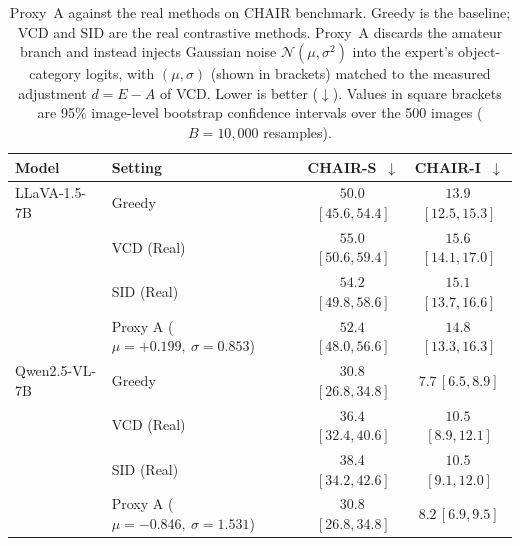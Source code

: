 \begin{table}[h]
  \centering
  \small
  \setlength{\tabcolsep}{6pt}
  \vspace{\baselineskip}
  \caption{Proxy~A against the real methods on CHAIR benchmark. Greedy is the
  baseline; VCD and SID are the real contrastive methods. Proxy~A discards the
  amateur branch and instead injects Gaussian noise $\mathcal{N}(\mu,\sigma^{2})$
  into the expert's object-category logits, with $(\mu,\sigma)$ (shown in
  brackets) matched to the measured adjustment $d = E - A$ of VCD. Lower is better ($\downarrow$).
  Values in square brackets are 95\% image-level bootstrap confidence intervals over the 500 images ($B=10{,}000$ resamples).}
  \vspace{\baselineskip}
  \label{tab:proxyA-noise}
  \begin{tabular}{ll cc}
    \toprule
    Model & Setting & CHAIR-S~$\downarrow$ & CHAIR-I~$\downarrow$ \\
    \midrule
    LLaVA-1.5-7B  & Greedy    & $50.0$\,{\scriptsize$[45.6,54.4]$} & $13.9$\,{\scriptsize$[12.5,15.3]$} \\
                  & VCD (Real) & $55.0$\,{\scriptsize$[50.6,59.4]$} & $15.6$\,{\scriptsize$[14.1,17.0]$} \\
                  & SID (Real) & $54.2$\,{\scriptsize$[49.8,58.6]$} & $15.1$\,{\scriptsize$[13.7,16.6]$} \\
                  & Proxy A ($\mu{=}{+}0.199,\ \sigma{=}0.853$) & $52.4$\,{\scriptsize$[48.0,56.6]$} & $14.8$\,{\scriptsize$[13.3,16.3]$} \\
    \midrule
    Qwen2.5-VL-7B & Greedy    & $30.8$\,{\scriptsize$[26.8,34.8]$} & $7.7$\,{\scriptsize$[6.5,8.9]$} \\
                  & VCD (Real) & $36.4$\,{\scriptsize$[32.4,40.6]$} & $10.5$\,{\scriptsize$[8.9,12.1]$} \\
                  & SID (Real) & $38.4$\,{\scriptsize$[34.2,42.6]$} & $10.5$\,{\scriptsize$[9.1,12.0]$} \\
                  & Proxy A ($\mu{=}{-}0.846,\ \sigma{=}1.531$) & $30.8$\,{\scriptsize$[26.8,34.8]$} & $8.2$\,{\scriptsize$[6.9,9.5]$} \\
    \bottomrule
  \end{tabular}
\end{table}

